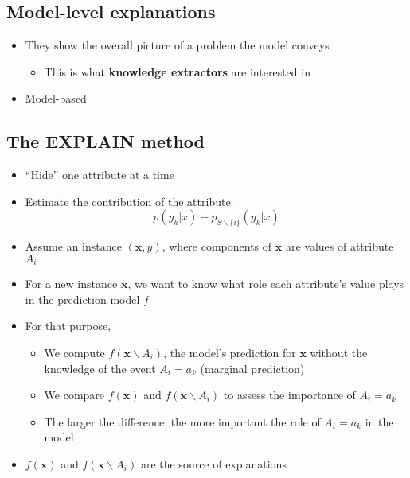 \documentclass{article}
\begin{document}
    \subsection{Model-level explanations}
    \begin{itemize}
        \item They show the overall picture of a problem the model conveys
        \begin{itemize}
            \item This is what \textbf{knowledge extractors} are interested in
        \end{itemize}
        \item Model-based
    \end{itemize}

    \subsection{The EXPLAIN method}
    \begin{itemize}
        \item ``Hide'' one attribute at a time
        \item Estimate the contribution of the attribute:
        \[ p(y_k \vert x) - p_{S \backslash \{i\}}  (y_k \vert x) \]
        \item Assume an instance $(\mathbf{x}, y)$, where components of $\mathbf{x}$ are values of attribute $A_i$
        \item For a new instance $\mathbf{x}$, we want to know what role each attribute's value plays in the prediction model $f$
        \item For that purpose,
        \begin{itemize}
            \item We compute $f(\mathbf{x} \backslash A_i)$, the model's prediction for $\mathbf{x}$ without the knowledge of the event $A_i = a_k$ (marginal prediction)
            \item We compare $f(\mathbf{x})$ and $f(\mathbf{x} \backslash A_i)$ to assess the importance of $A_i = a_k$
            \item The larger the difference, the more important the role of $A_i = a_k$ in the model
        \end{itemize}
        \item $f(\mathbf{x})$ and $f(\mathbf{x} \backslash A_i)$ are the source of explanations
    \end{itemize}
\end{document}
